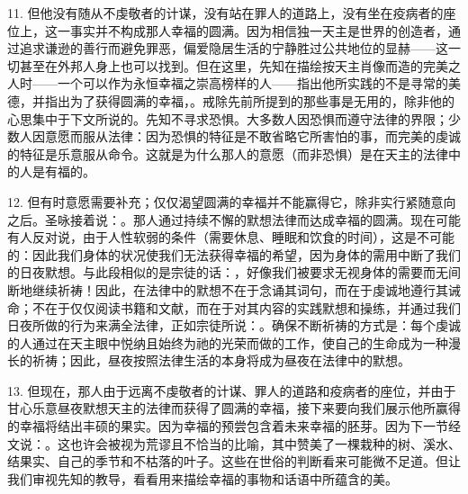 11. 但他没有随从不虔敬者的计谋，没有站在罪人的道路上，没有坐在疫病者的座位上，这一事实并不构成那人幸福的圆满。因为相信独一天主是世界的创造者，通过追求谦逊的善行而避免罪恶，偏爱隐居生活的宁静胜过公共地位的显赫——这一切甚至在外邦人身上也可以找到。但在这里，先知在描绘按天主肖像而造的完美之人时——一个可以作为永恒幸福之崇高榜样的人——指出他所实践的不是寻常的美德，并指出为了获得圆满的幸福，。戒除先前所提到的那些事是无用的，除非他的心思集中于下文所说的。先知不寻求恐惧。大多数人因恐惧而遵守法律的界限；少数人因意愿而服从法律：因为恐惧的特征是不敢省略它所害怕的事，而完美的虔诚的特征是乐意服从命令。这就是为什么那人的意愿（而非恐惧）是在天主的法律中的人是有福的。\par

12. 但有时意愿需要补充；仅仅渴望圆满的幸福并不能赢得它，除非实行紧随意向之后。圣咏接着说：。那人通过持续不懈的默想法律而达成幸福的圆满。现在可能有人反对说，由于人性软弱的条件（需要休息、睡眠和饮食的时间），这是不可能的：因此我们身体的状况使我们无法获得幸福的希望，因为身体的需用中断了我们的日夜默想。与此段相似的是宗徒的话：，好像我们被要求无视身体的需要而无间断地继续祈祷！因此，在法律中的默想不在于念诵其词句，而在于虔诚地遵行其诫命；不在于仅仅阅读书籍和文献，而在于对其内容的实践默想和操练，并通过我们日夜所做的行为来满全法律，正如宗徒所说：。确保不断祈祷的方式是：每个虔诚的人通过在天主眼中悦纳且始终为祂的光荣而做的工作，使自己的生命成为一种漫长的祈祷；因此，昼夜按照法律生活的本身将成为昼夜在法律中的默想。\par

13. 但现在，那人由于远离不虔敬者的计谋、罪人的道路和疫病者的座位，并由于甘心乐意昼夜默想天主的法律而获得了圆满的幸福，接下来要向我们展示他所赢得的幸福将结出丰硕的果实。因为幸福的预尝包含着未来幸福的胚芽。因为下一节经文说：。这也许会被视为荒谬且不恰当的比喻，其中赞美了一棵栽种的树、溪水、结果实、自己的季节和不枯落的叶子。这些在世俗的判断看来可能微不足道。但让我们审视先知的教导，看看用来描绘幸福的事物和话语中所蕴含的美。\par

